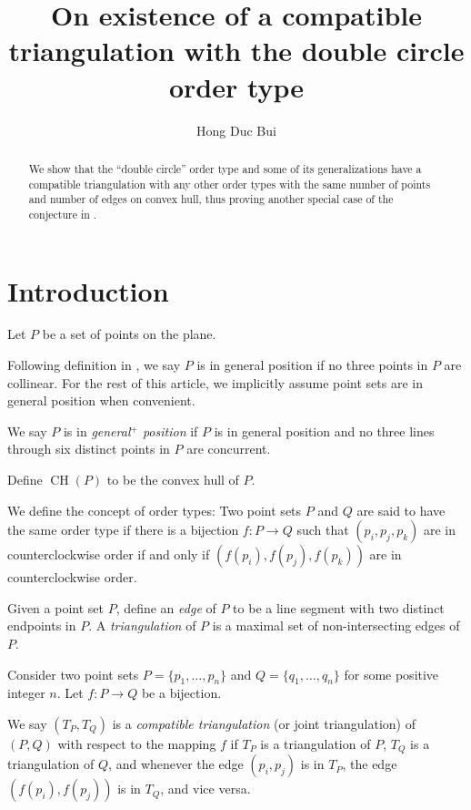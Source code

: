 \documentclass{article}
\theoremstyle{plain}
\begin{document}
\newcommand\CH{\operatorname{CH}}
\newcommand\Int{\operatorname{Int}}
\newcommand\absCH[1]{\lvert\CH(#1)\rvert}

\title{On existence of a compatible triangulation with the double circle order type}
\author{Hong Duc Bui}
\maketitle

\begin{abstract}
	We show that the ``double circle'' order type and some of its generalizations have a compatible triangulation
	with any other order types with the same number of points and number of edges
	on convex hull,
	thus proving another special case of the conjecture in \cite{Aichholzer_2003}.
\end{abstract}

\section{Introduction}

Let $P$ be a set of points on the plane.

\label{def_general_position}
Following definition in \cite{Aichholzer_2003}, we say $P$ is in general position if no three points in $P$ are collinear.
For the rest of this article, we implicitly assume point sets are in general position when convenient.

We say $P$ is in \emph{general$^+$ position} if $P$ is in general position and no three lines through six distinct points in $P$ are concurrent.

Define $\CH(P)$ to be the convex hull of $P$.

\label{def_order_type}
We define the concept of order types: Two point sets $P$ and $Q$ are said to have the same order type if there is a bijection $f \colon P \to Q$ such that $(p_i, p_j, p_k)$ are in counterclockwise order if and only if
$(f(p_i), f(p_j), f(p_k))$ are in counterclockwise order.

Given a point set $P$,
define an \emph{edge} of $P$ to be a line segment with two distinct endpoints in $P$.
A \emph{triangulation} of $P$ is a maximal set of non-intersecting edges of $P$.

Consider two point sets $P = \{ p_1, \dots, p_n \}$ and $Q= \{ q_1, \dots, q_n\}$ for some positive integer $n$.
Let $f\colon P \to Q$ be a bijection.

\label{def_compatible_triangulation}
We say $(T_P, T_Q)$ is a \emph{compatible triangulation} (or joint triangulation) of $(P, Q)$
with respect to the mapping $f$
if $T_P$ is a triangulation of $P$,
$T_Q$ is a triangulation of $Q$,
and whenever the edge $(p_i, p_j)$ is in $T_P$,
the edge $(f(p_i), f(p_j))$ is in $T_Q$, and vice versa.
\end{document}
